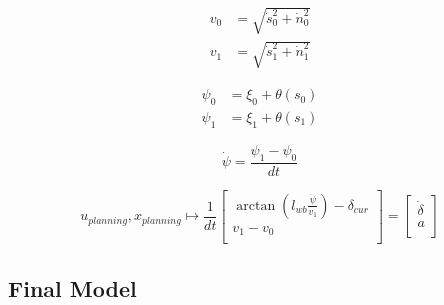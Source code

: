 \[
	\begin{aligned}
		v_0 & = \sqrt{\dot{s}_0^2 + \dot{n}_0^2} \\
		v_1 & = \sqrt{\dot{s}_1^2 + \dot{n}_1^2}
	\end{aligned}
\]

\[
	\begin{aligned}
		\psi_0 & = \xi_0 + \theta(s_0) \\
		\psi_1 & = \xi_1 + \theta(s_1)
	\end{aligned}
\]

\[
	\dot{\psi} = \frac{\psi_1 - \psi_0}{dt}
\]

\[
	u_{planning}, x_{planning} \mapsto \frac{1}{dt} \begin{bmatrix}
		\arctan(l_{wb}\frac{\dot{\psi}}{v_1})-\delta_{cur} \\
		v_1 - v_0                                          \\
	\end{bmatrix} = \begin{bmatrix}
		\dot{\delta} \\
		a            \\
	\end{bmatrix}
\]

\subsection{Final Model} \label{subsec:pm_resulting_model}